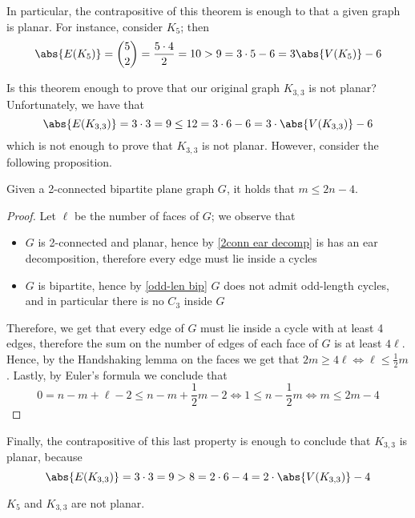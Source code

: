 \documentclass[a4paper, 12pt]{report}
\begin{document}
    In particular, the contrapositive of this theorem is enough to  that a given graph is  planar. For instance, consider $K_5$; then $$\abs{E(K_5)} = \binom{5}{2} = \dfrac{5 \cdot 4}{2} = 10 > 9 = 3 \cdot 5 - 6 = 3 \abs{V(K_5)} - 6$$

    Is this theorem enough to prove that our original graph $K_{3,3}$ is not planar? Unfortunately, we have that $$\abs{E(K_{3, 3})} = 3 \cdot 3 = 9 \le 12 = 3 \cdot 6 - 6 = 3 \cdot \abs{V(K_{3, 3})} - 6$$ which is not enough to prove that $K_{3,3}$ is not planar. However, consider the following proposition.

    \begin{framedprop}{}
        Given a 2-connected bipartite plane graph $G$, it holds that $m \le 2n - 4$.
    \end{framedprop}

    \begin{proof}
        Let $\ell$ be the number of faces of $G$; we observe that

        \begin{itemize}
            \item $G$ is 2-connected and planar, hence by \cref{2conn ear decomp} is has an ear decomposition, therefore every edge must lie inside a cycles
            \item $G$ is bipartite, hence by \cref{odd-len bip} $G$ does not admit odd-length cycles, and in particular there is no $C_3$ inside $G$
        \end{itemize}

        Therefore, we get that every edge of $G$ must lie inside a cycle with at least 4 edges, therefore the sum on the number of edges of each face of $G$ is at least $4 \ell$. Hence, by the Handshaking lemma on the faces we get that $2 m \ge 4 \ell \iff \ell \le \tfrac{1}{2}m$. Lastly, by Euler's formula we conclude that $$0 = n - m + \ell - 2 \le n - m + \dfrac{1}{2} m - 2 \iff 1 \le n - \dfrac{1}{2} m \iff m \le 2m - 4$$
    \end{proof}

    Finally, the contrapositive of this last property is enough to conclude that $K_{3,3}$ is  planar, because $$\abs{E(K_{3,3})} = 3 \cdot 3 = 9 > 8 = 2 \cdot 6 - 4 = 2 \cdot \abs{V(K_{3, 3})} - 4$$

    \begin{framedcor}{}
        $K_5$ and $K_{3,3}$ are not planar.
    \end{framedcor}
\end{document}
